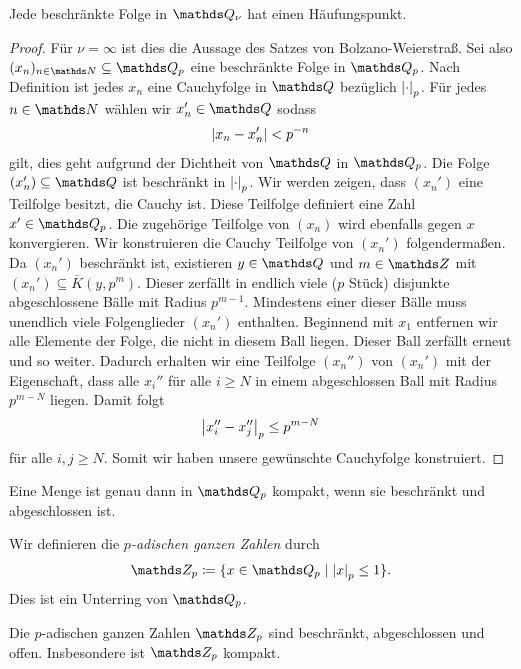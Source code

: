\begin{thm}
Jede beschränkte Folge in $\Q_\nu$ hat einen Häufungspunkt.
\begin{proof}
Für $\nu=\infty$ ist dies die Aussage des Satzes von Bolzano-Weierstraß.
Sei also $(x_n)_{n\in \N} \subseteq \Q_p$ eine beschränkte Folge in $\Q_p$.
Nach Definition ist jedes $x_n$ eine Cauchyfolge in $\Q$ bezüglich $\left\vert\cdot\right\vert_p$.
Für jedes $n \in \N$ wählen wir $x_n' \in \Q$ sodass
\begin{align*}
\left\vert x_n-x_n'\right\vert<p^{-n}
\end{align*}
gilt, dies geht aufgrund der Dichtheit von $\Q$ in $\Q_p$.
Die Folge $(x_n')\subseteq \Q$ ist beschränkt in $\left\vert\cdot\right\vert_p$.
Wir werden zeigen, dass $(x_n')$ eine Teilfolge besitzt, die Cauchy ist.
Diese Teilfolge definiert eine Zahl $x'\in \Q_p$.
Die zugehörige Teilfolge von $(x_n)$ wird ebenfalls gegen $x$ konvergieren.
Wir konstruieren die Cauchy Teilfolge von $(x_n')$ folgendermaßen.
Da $(x_n')$ beschränkt ist, existieren $y \in \Q$ und $m\in \Z$ mit $(x_n')\subseteq \overline{K}(y,p^m)$. Dieser zerfällt in endlich viele ($p$ Stück) disjunkte abgeschlossene Bälle mit Radius $p^{m-1}$.
Mindestens einer dieser Bälle muss unendlich viele Folgenglieder $(x_n')$ enthalten.
Beginnend mit $x_1$ entfernen wir alle Elemente der Folge, die nicht in diesem Ball liegen.
Dieser Ball zerfällt erneut und so weiter.
Dadurch erhalten wir eine Teilfolge $(x_n'')$ von $(x_n')$ mit der Eigenschaft,
dass alle $x_i''$ für alle $i\geq N$ in einem abgeschlossen Ball
mit Radius $p^{m-N}$ liegen. Damit folgt
\begin{align*}
\left\vert x_i''-x_j''\right\vert_p\leq p^{m-N}
\end{align*}
für alle $i,j\geq N$. Somit wir haben unsere gewünschte Cauchyfolge konstruiert.
\end{proof}
\end{thm}

\begin{cor}
Eine Menge ist genau dann in $\Q_p$ kompakt, wenn sie beschränkt und abgeschlossen ist.
\end{cor}

\begin{defi}
Wir definieren die \emph{$p$-adischen ganzen Zahlen} durch
\begin{align*}
\Z_p\coloneqq \{x\in \Q_p \mid \abs{x}_p \leq 1\}.
\end{align*}
Dies ist ein Unterring von $\Q_p$.
\end{defi}

\begin{satz}
Die $p$-adischen ganzen Zahlen $\Z_p$ sind beschränkt, abgeschlossen und offen.
Insbesondere ist $\Z_p$ kompakt.
\end{satz}

